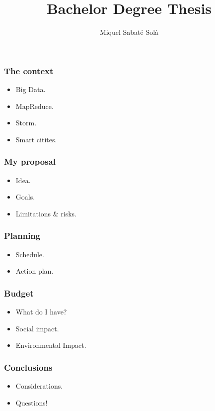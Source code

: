 \documentclass[12pt]{beamer}
\title{Bachelor Degree Thesis}
\author{Miquel Sabaté Solà}
\date{}
\begin{document}
\frame{\titlepage}


\begin{frame}
\vfill
  \frametitle{The context}
  \begin{itemize}
    \item Big Data.
    \vfill
    \item MapReduce.
    \vfill
    \item Storm.
    \vfill
    \item Smart citites.
    \vfill
  \end{itemize}
\vfill
\end{frame}

\begin{frame}
\vfill
  \frametitle{My proposal}
  \begin{itemize}
    \item Idea.
    \vfill
    \item Goals.
    \vfill
    \item Limitations \& risks.
    \vfill
  \end{itemize}
\vfill
\end{frame}

\begin{frame}
\vfill
  \frametitle{Planning}
  \begin{itemize}
    \item Schedule.
    \vfill
    \item Action plan.
    \vfill
  \end{itemize}
\vfill
\end{frame}

\begin{frame}
\vfill
  \frametitle{Budget}
  \begin{itemize}
    \item What do I have?
    \vfill
    \item Social impact.
    \vfill
    \item Environmental Impact.
    \vfill
  \end{itemize}
\vfill
\end{frame}

\begin{frame}
\vfill
  \frametitle{Conclusions}
  \begin{itemize}
    \item Considerations.
    \vfill
    \item Questions!
    \vfill
  \end{itemize}
\vfill
\end{frame}
\end{document}
